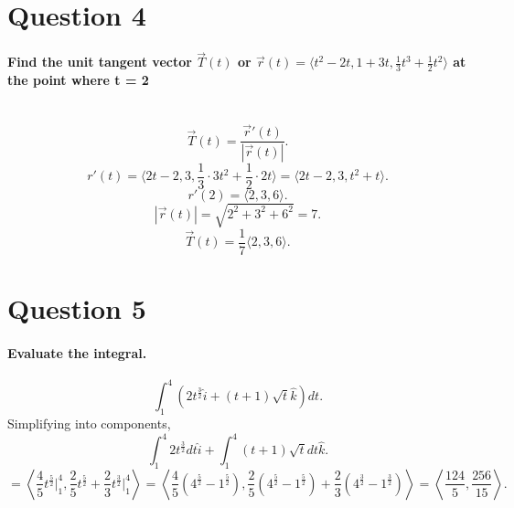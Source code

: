 \section{Question 4}%
\label{sec: Question 4 }
\paragraph{Find the unit tangent vector $ \vec{ T }\left( t \right)  $ or $ \vec{ r }\left( t \right) = \langle t^2-2t, 1+3t, \frac{ 1 }{ 3 } t^3+\frac{ 1 }{ 2 } t^2 \rangle $ at the point where t = 2 \\ \\}
\[
\vec{ T }\left( t \right) = \frac{ \vec{ r }'\left( t \right)  }{ \left| \vec{ r }
\left( t \right) \right| }
.\] 
\[
r'\left( t \right) = \langle 2t-2, 3, \frac{ 1 }{ 3 } \cdot 3t^2+\frac{ 1 }{ 2 } \cdot 2t \rangle = \langle 2t-2, 3, t^2+t \rangle
.\] 
\[
r'\left( 2 \right) = \langle 2,3,6 \rangle
.\] 
\[
\left| \vec{ r }\left( t \right)  \right| = \sqrt{ 2^2 + 3^2 + 6^2 } = 7 
.\] 
\[
\vec{ T }\left( t \right)  = \frac{ 1 }{ 7 } \langle 2,3,6 \rangle
.\] 
\section{Question 5}%
\label{sec: Question 5 }
\paragraph{Evaluate the integral.}
\[
\int_{ 1 }^{ 4 } \left( 2t^{ \frac{ 3 }{ 2 }  }\hat{ i }+\left( t+1 \right) \sqrt{ t } \hat{ k } \right) dt
.\] 
Simplifying into components,
\[
\int_{ 1 }^{ 4 } 2t^{ \frac{ 3 }{ 2 }  }dt\hat{ i }+\int_{ 1 }^{ 4 } \left( t+1 \right) \sqrt{ t } dt \hat{ k }
.\] 
\[
=\left\langle \frac{ 4 }{ 5 } t^{ \frac{ 5 }{ 2 }  }\bigg|_{ 1 }^{ 4 }, \frac{ 2 }{ 5 } t^{ \frac{ 5 }{ 2 }  }+ \frac{ 2 }{ 3 } t^{ \frac{ 3 }{ 2 }  } \bigg|_{ 1 }^{ 4 } \right\rangle = \left\langle \frac{ 4 }{ 5 } \left( 4^{ \frac{ 5 }{ 2 }  }-1^{ \frac{ 5 }{ 2 }  } \right) , \frac{ 2 }{ 5 } \left( 4^{ \frac{ 5 }{ 2 }  }-1^{ \frac{ 5 }{ 2 }  } \right) + \frac{ 2 }{ 3 }\left( 4^{ \frac{ 3 }{ 2 }  }-1^{ \frac{ 3 }{ 2 }  }\right) \right\rangle = \left\langle \frac{ 124 }{ 5 } , \frac{ 256 }{ 15 } \right\rangle
.\] 
